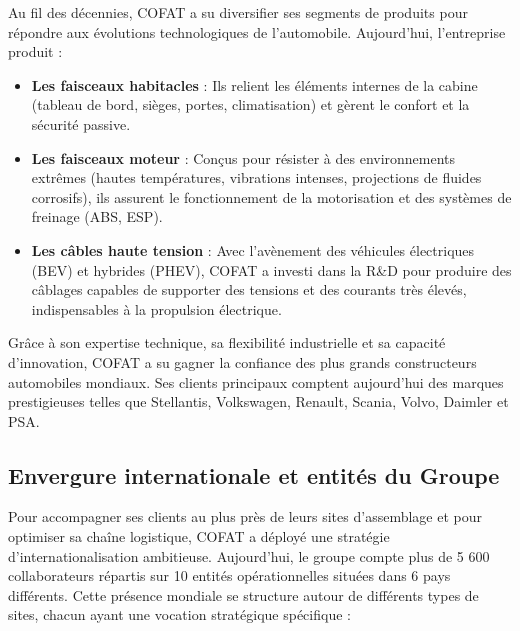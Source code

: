 Au fil des décennies, COFAT a su diversifier ses segments de produits pour répondre aux évolutions technologiques de l'automobile. Aujourd'hui, l'entreprise produit :
\begin{itemize}
    \item \textbf{Les faisceaux habitacles} : Ils relient les éléments internes de la cabine (tableau de bord, sièges, portes, climatisation) et gèrent le confort et la sécurité passive.
    \item \textbf{Les faisceaux moteur} : Conçus pour résister à des environnements extrêmes (hautes températures, vibrations intenses, projections de fluides corrosifs), ils assurent le fonctionnement de la motorisation et des systèmes de freinage (ABS, ESP).
    \item \textbf{Les câbles haute tension} : Avec l'avènement des véhicules électriques (BEV) et hybrides (PHEV), COFAT a investi dans la R\&D pour produire des câblages capables de supporter des tensions et des courants très élevés, indispensables à la propulsion électrique.
\end{itemize}

Grâce à son expertise technique, sa flexibilité industrielle et sa capacité d'innovation, COFAT a su gagner la confiance des plus grands constructeurs automobiles mondiaux. Ses clients principaux comptent aujourd'hui des marques prestigieuses telles que Stellantis, Volkswagen, Renault, Scania, Volvo, Daimler et PSA.

\subsection{Envergure internationale et entités du Groupe}
Pour accompagner ses clients au plus près de leurs sites d'assemblage et pour optimiser sa chaîne logistique, COFAT a déployé une stratégie d'internationalisation ambitieuse. Aujourd'hui, le groupe compte plus de 5 600 collaborateurs répartis sur 10 entités opérationnelles situées dans 6 pays différents. Cette présence mondiale se structure autour de différents types de sites, chacun ayant une vocation stratégique spécifique :

